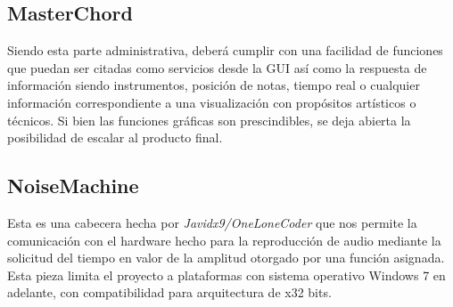 \documentclass{book}
\begin{document}
	\subsection*{MasterChord}
	Siendo esta parte administrativa, deberá cumplir con una facilidad de funciones que puedan ser citadas como servicios desde la GUI así como la respuesta de información siendo instrumentos, posición de notas, tiempo real o cualquier información correspondiente a una visualización con propósitos artísticos o técnicos. Si bien las funciones gráficas son prescindibles, se deja abierta la posibilidad de escalar al producto final.
	\subsection*{NoiseMachine}
	Esta es una cabecera hecha por \emph{Javidx9/OneLoneCoder} que nos permite la comunicación con el hardware hecho para la reproducción de audio mediante la solicitud del tiempo en valor de la amplitud otorgado por una función asignada. Esta pieza limita el proyecto a plataformas con sistema operativo Windows 7 en adelante, con compatibilidad para arquitectura de x32 bits.
\end{document}
